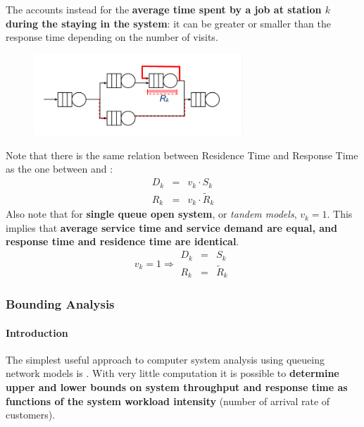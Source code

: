 \noindent
The  accounts instead for the \textbf{average time spent by a job at station $k$ during the staying in the system}: it can be greater or smaller than the response time depending on the number of visits.
\begin{figure}[!htp]
	\centering
	\includegraphics[width=0.7\textwidth]{img/residence-time.png}
\end{figure}

\noindent
Note that there is the same relation between Residence Time and Response Time as the one between  and :
\begin{equation}
	\begin{array}{rcl}
		D_{k} &=& v_{k} \cdot S_{k} \\ [.3em]
		R_{k} &=& v_{k} \cdot \tilde{R}_{k}
	\end{array}
\end{equation}
Also note that for \textbf{single queue open system}, or \emph{tandem models}, $v_{k} = 1$. This implies that \textbf{average service time and service demand are equal, and response time and residence time are identical}.
\begin{equation*}
	v_{k} = 1 \Rightarrow
	\begin{array}{rcl}
		D_{k} &=& S_{k} \\ [.3em]
		R_{k} &=& \tilde{R}_{k}
	\end{array}
\end{equation*}

\newpage

\subsubsection{Bounding Analysis}

\paragraph{Introduction}

The simplest useful approach to computer system analysis using queueing network models is . With very little computation it is possible to \textbf{determine upper and lower bounds on system throughput and response time as functions of the system workload intensity} (number of arrival rate of customers).

